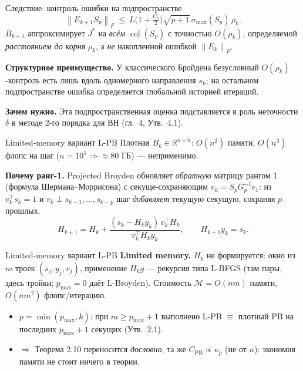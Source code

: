 \documentclass[aspectratio=169,11pt,t]{beamer}
\newcommand{\R}{\mathbb{R}}
\newcommand{\Fn}[1]{\left\|#1\right\|_F}
\DeclareMathOperator{\col}{col}
\begin{document}
\begin{frame}{Следствие: контроль ошибки на подпространстве}
\[ \Fn{E_{k+1}S_p}\ \le\ L\Big(1+\tfrac{C_s}{2}\Big)\sqrt{p+1}\,\sigma_{\max}(S_p)\,\rho_k. \]
\(B_{k+1}\) аппроксимирует \(J^*\) на \emph{всём} \(\col(S_p)\) с точностью \(O(\rho_k)\),
определяемой \emph{расстоянием до корня} \(\rho_k\), а \emph{не} накопленной ошибкой \(\Fn{E_k}\).

\medskip
\textbf{Структурное преимущество.} У классического Бройдена безусловный
\(O(\rho_k)\)-контроль есть лишь вдоль одномерного направления \(s_k\); на остальном
подпространстве ошибка определяется глобальной историей итераций.

\medskip
\textbf{Зачем нужно.} Эта подпространственная оценка подставляется в роль неточности
\(\delta\) в методе 2-го порядка для ВН (гл.~4, Утв.~4.1).
\end{frame}

\begin{frame}{Limited-memory вариант L-PB}
Плотная \(B_k\in\R^{n\times n}\): \(O(n^2)\) памяти, \(O(n^3)\) флопс на шаг
(\(n=10^5\Rightarrow\approx80\) ГБ) — неприменимо.

\medskip
\textbf{Почему ранг-1.} Projected Broyden обновляет \emph{обратную} матрицу рангом 1
(формула Шермана–Моррисона) с секуще-сохраняющим \(v_k=S_pG_p^{-1}e_1\): из
\(v_k^\top s_k=1\) и \(v_k\perp s_{k-1},\dots,s_{k-p}\) шаг \emph{добавляет} текущую
секущую, сохраняя \(p\) прошлых.
\[ H_{k+1}=H_k+\frac{(s_k-H_ky_k)\,v_k^\top H_k}{v_k^\top H_ky_k},\qquad H_{k+1}y_k=s_k. \]
\end{frame}

\begin{frame}{Limited-memory вариант L-PB}
\textbf{Limited memory.} \(H_k\) не формируется: окно из \(m\) троек \((s_j,y_j,v_j)\),
применение \(H_kg\) — рекурсия типа L-BFGS (там пары, здесь тройки; \(p_{\max}=0\) даёт
L-Broyden). Стоимость \(\mathcal{M}=O(nm)\) памяти, \(O(nm^2)\) флопс/итерацию.

\medskip
\begin{itemize}\setlength{\itemsep}{8pt}
  \item \(p=\min(p_{\max},k)\); при \(m\ge p_{\max}{+}1\) выполнено L-PB \(\equiv\) плотный PB
        на последних \(p_{\max}{+}1\) секущих (Утв.~2.1).
  \item \(\Rightarrow\) Теорема 2.10 переносится \emph{дословно}, та же
        \(C_{\mathrm{PB}}\propto\kappa_p\) (не от \(n\)): экономия памяти не стоит ничего
        в теории.
\end{itemize}
\end{frame}
\end{document}
